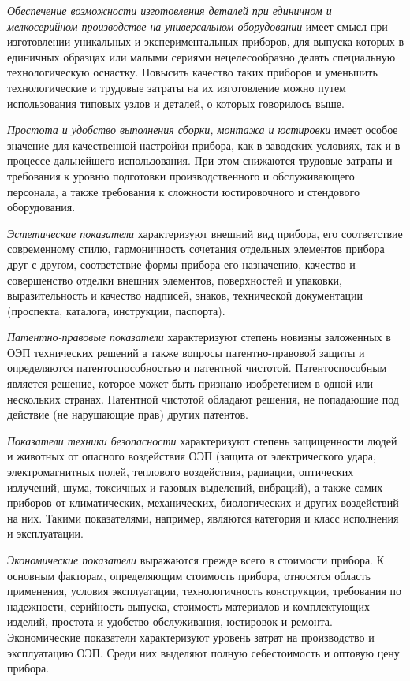 \textit{Обеспечение возможности изготовления деталей при единичном и мелкосерийном производстве на универсальном оборудовании} имеет смысл при изготовлении уникальных и экспериментальных приборов, для выпуска которых в единичных образцах или малыми сериями нецелесообразно делать специальную технологическую оснастку. 
Повысить качество таких приборов и уменьшить технологические и трудовые затраты на их изготовление можно путем использования типовых узлов и деталей, о которых говорилось выше.

\textit{Простота и удобство выполнения сборки, монтажа и юстировки} имеет особое значение для качественной настройки прибора, как в заводских условиях, так и в процессе дальнейшего использования. 
При этом снижаются трудовые затраты и требования к уровню подготовки производственного и обслуживающего персонала, а также требования к сложности юстировочного и стендового оборудования.

\textit{Эстетические показатели} характеризуют внешний вид прибора, его соответствие современному стилю, гармоничность сочетания отдельных элементов прибора друг с другом, соответствие формы прибора его назначению, качество и совершенство отделки внешних элементов, поверхностей и упаковки, выразительность и качество надписей, знаков, технической документации (проспекта, каталога, инструкции, паспорта).

\textit{Патентно-правовые показатели} характеризуют степень новизны заложенных в ОЭП технических решений а также вопросы патентно-правовой  защиты и определяются патентоспособностью и патентной чистотой. 
Патентоспособным является решение, которое может быть признано изобретением в одной или нескольких странах. 
Патентной чистотой обладают решения, не попадающие под действие (не нарушающие прав) других патентов.

\textit{Показатели техники безопасности} характеризуют степень защищенности людей и животных от опасного воздействия ОЭП (защита от электрического удара, электромагнитных полей, теплового воздействия, радиации, оптических излучений, шума, токсичных и газовых выделений, вибраций), а также самих приборов от климатических, механических, биологических и других воздействий на них. Такими показателями, например, являются категория и класс исполнения и эксплуатации.

\textit{Экономические показатели} выражаются прежде всего в стоимости прибора. 
К основным факторам, определяющим стоимость прибора, относятся область применения, условия эксплуатации, технологичность конструкции, требования по надежности, серийность выпуска, стоимость материалов и комплектующих изделий, простота и удобство обслуживания, юстировок и ремонта. 
Экономические показатели характеризуют уровень затрат на производство и эксплуатацию ОЭП. 
Среди них выделяют полную себестоимость и оптовую цену прибора. 

